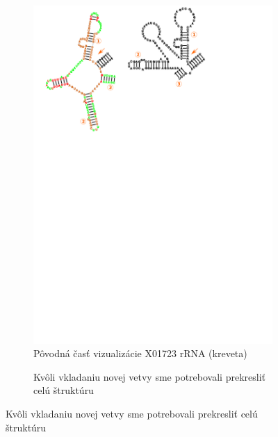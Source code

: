 \begin{figure}[t!]
  \begin{subfigure}[t]{\wi}
    \caption{Pôvodná časť vizualizácie X01723 rRNA (kreveta)}
    \includegraphics[clip, trim=8cm 18cm 5cm 0, width=1\textwidth]{../img/alg/insert/multibranch-redraw}
  \end{subfigure}
  \begin{subfigure}[t]{\wi}
    \caption{Kvôli vkladaniu novej vetvy sme potrebovali prekresliť celú štruktúru}

\end{subfigure}
\end{figure}
